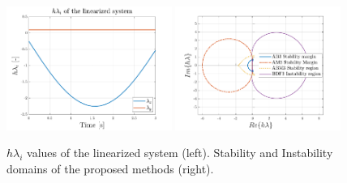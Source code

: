 \documentclass[11pt,a4paper,oneside]{article}
\begin{document}
\begin{figure}[h]
    \includegraphics[width=0.48\textwidth]{gfx/ex7_5.pdf}
    \includegraphics[width=0.48\textwidth]{gfx/ex7_6.pdf}
    \caption{$h\lambda_i$ values of the linearized system (left). Stability and Instability domains of the proposed methods (right).}
    \label{fig:ex7_3}
\end{figure}

\clearpage
\end{document}
